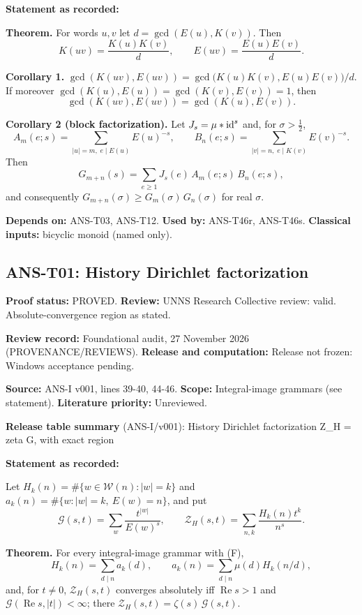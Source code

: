 \documentclass[
  11pt,
]{article}
\begin{document}
\textbf{Statement as recorded:}

\textbf{Theorem.} For words \(u,v\) let \(d=\gcd(E(u),K(v))\). Then
\[K(uv)=\frac{K(u)K(v)}d,\qquad E(uv)=\frac{E(u)E(v)}d .\]

\textbf{Corollary 1.}
\(\gcd(K(uv),E(uv))=\gcd\big(K(u)K(v),E(u)E(v)\big)/d\). If moreover
\(\gcd(K(u),E(u))=\gcd(K(v),E(v))=1\), then
\[\gcd(K(uv),E(uv))=\gcd(K(u),E(v)).\]

\textbf{Corollary 2 (block factorization).} Let \(J_s=\mu*{\rm id}^s\)
and, for \(\sigma>\frac12\),
\[A_m(e;s)=\sum_{|u|=m,\;e\mid E(u)}E(u)^{-s},\qquad B_n(e;s)=\sum_{|v|=n,\;e\mid K(v)}E(v)^{-s}.\]
Then \[G_{m+n}(s)=\sum_{e\ge1}J_s(e)\,A_m(e;s)\,B_n(e;s),\] and
consequently \(G_{m+n}(\sigma)\ge G_m(\sigma)\,G_n(\sigma)\) for real
\(\sigma\).

\textbf{Depends on:} ANS-T03, ANS-T12. \textbf{Used by:} ANS-T46r,
ANS-T46s. \textbf{Classical inputs:} bicyclic monoid (named only).

\hypertarget{ans-t01-history-dirichlet-factorization}{%
\subsection{ANS-T01: History Dirichlet
factorization}\label{ans-t01-history-dirichlet-factorization}}

\textbf{Proof status:} PROVED. \textbf{Review:} UNNS Research Collective
review: valid. Absolute-convergence region as stated.

\textbf{Review record:} Foundational audit, 27 November 2026
(PROVENANCE/REVIEWS). \textbf{Release and computation:} Release not
frozen: Windows acceptance pending.

\textbf{Source:} ANS-I v001, lines 39-40, 44-46. \textbf{Scope:}
Integral-image grammars (see statement). \textbf{Literature priority:}
Unreviewed.

\textbf{Release table summary} (ANS-I/v001): History Dirichlet
factorization Z\_H = zeta G, with exact region

\textbf{Statement as recorded:}

Let \(H_k(n)=\#\{w\in\mathcal W(n):|w|=k\}\) and
\(a_k(n)=\#\{w:|w|=k,\ E(w)=n\}\), and put
\[\mathcal G(s,t)=\sum_w\frac{t^{|w|}}{E(w)^s},\qquad \mathcal Z_H(s,t)=\sum_{n,k}\frac{H_k(n)t^k}{n^s}.\]

\textbf{Theorem.} For every integral-image grammar with (F),
\[H_k(n)=\sum_{d\mid n}a_k(d),\qquad a_k(n)=\sum_{d\mid n}\mu(d)H_k(n/d),\]
and, for \(t\ne0\), \(\mathcal Z_H(s,t)\) converges absolutely iff
\(\operatorname{Re}s>1\) and
\(\mathcal G(\operatorname{Re}s,|t|)<\infty\); there
\(\mathcal Z_H(s,t)=\zeta(s)\,\mathcal G(s,t)\).
\end{document}
